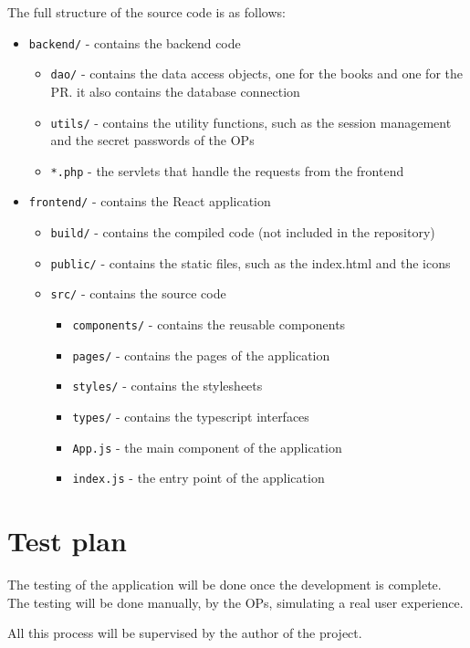 The full structure of the source code is as follows:
\begin{itemize}[label={}]
    \item \texttt{backend/} - contains the backend code
          \begin{itemize}[label={}]
              \item \texttt{dao/} - contains the data access objects, one for the books and one for the PR. it also contains the database connection
              \item \texttt{utils/} - contains the utility functions, such as the session management and the secret passwords of the OPs
              \item \texttt{*.php} - the servlets that handle the requests from the frontend
          \end{itemize}
    \item \texttt{frontend/} - contains the React application
          \begin{itemize}[label={}]
              \item \texttt{build/} - contains the compiled code (not included in the repository)
              \item \texttt{public/} - contains the static files, such as the index.html and the icons
              \item \texttt{src/} - contains the source code
                    \begin{itemize}[label={}]
                        \item \texttt{components/} - contains the reusable components
                        \item \texttt{pages/} - contains the pages of the application
                        \item \texttt{styles/} - contains the stylesheets
                        \item \texttt{types/} - contains the typescript interfaces
                        \item \texttt{App.js} - the main component of the application
                        \item \texttt{index.js} - the entry point of the application
                    \end{itemize}
          \end{itemize}
\end{itemize}

\section{Test plan}

The testing of the application will be done once the development is complete. The testing will be done manually, by the OPs, simulating a real user experience.

All this process will be supervised by the author of the project.